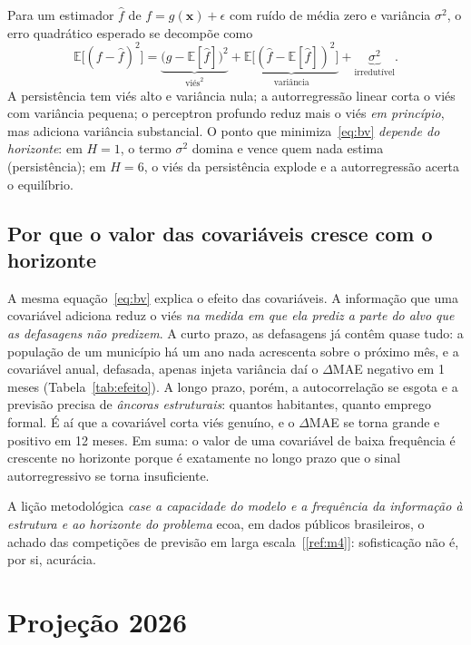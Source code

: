 \documentclass[12pt,a4paper,oneside]{article}
\newcommand{\C}[1]{[\ref{#1}]}
\begin{document}
Para um estimador $\widehat{f}$ de $f=g(\bm x)+\epsilon$ com ruído de média
zero e variância $\sigma^2$, o erro quadrático esperado se decompõe como
\begin{equation}
\mathbb{E}\bigl[(f-\widehat{f})^2\bigr]
= \underbrace{\bigl(g-\mathbb{E}[\widehat{f}]\bigr)^2}_{\text{viés}^2}
+ \underbrace{\mathbb{E}\bigl[(\widehat{f}-\mathbb{E}[\widehat{f}])^2\bigr]}_{\text{variância}}
+ \underbrace{\sigma^2}_{\text{irredutível}} .
\label{eq:bv}
\end{equation}
A persistência tem viés alto e variância nula; a autorregressão linear
corta o viés com variância pequena; o perceptron profundo reduz mais o
viés \emph{em princípio}, mas adiciona variância substancial. O ponto que
minimiza~\eqref{eq:bv} \emph{depende do horizonte}: em $H=1$, o termo
$\sigma^2$ domina e vence quem nada estima (persistência); em $H=6$, o viés
da persistência explode e a autorregressão acerta o equilíbrio.

\subsection{Por que o valor das covariáveis cresce com o horizonte}

A mesma equação~\eqref{eq:bv} explica o efeito das covariáveis. A
informação que uma covariável adiciona reduz o viés \emph{na medida em que
ela prediz a parte do alvo que as defasagens não predizem}. A curto prazo,
as defasagens já contêm quase tudo: a população de um município há um ano
nada acrescenta sobre o próximo mês, e a covariável anual, defasada, apenas
injeta variância \textemdash{} daí o $\Delta$MAE negativo em
1 meses (Tabela~\ref{tab:efeito}). A longo prazo, porém, a
autocorrelação se esgota e a previsão precisa de \emph{âncoras
estruturais}: quantos habitantes, quanto emprego formal. É aí que a
covariável corta viés genuíno, e o $\Delta$MAE se torna grande e positivo
em 12 meses. Em suma: o valor de uma covariável de baixa frequência é
crescente no horizonte porque é exatamente no longo prazo que o sinal
autorregressivo se torna insuficiente.

A lição metodológica \textemdash{} \emph{case a capacidade do modelo e a
frequência da informação à estrutura e ao horizonte do problema}
\textemdash{} ecoa, em dados públicos brasileiros, o achado das competições
de previsão em larga escala~\C{ref:m4}: sofisticação não é, por si,
acurácia.

\section{Projeção 2026}
\label{sec:projecao}
\end{document}
